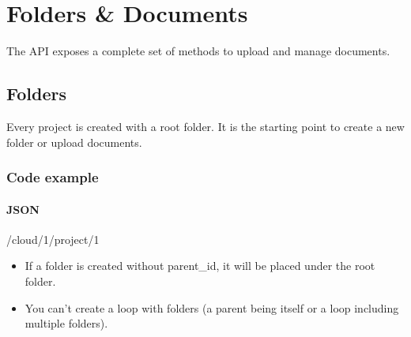\documentclass[a4paper,12pt,english]{sphinxmanual}
\begin{document}
\chapter{Folders \& Documents}
\label{\detokenize{folders_and_documents:folders-documents}}\label{\detokenize{folders_and_documents::doc}}
The API exposes a complete set of methods to upload and manage documents.


\section{Folders}
\label{\detokenize{folders_and_documents:folders}}
Every project is created with a root folder. It is the starting point to create a new folder or upload documents.


\subsection{Code example}
\label{\detokenize{folders_and_documents:code-example}}

\subsubsection{JSON}
\label{\detokenize{folders_and_documents:json}}
/cloud/1/project/1

%
\begin{sphinxVerbatim}[commandchars=\\\{\}]
     
     
     
     
     
     
     
\end{sphinxVerbatim}
\begin{itemize}
\item {} 
If a folder is created without parent\_id, it will be placed under the root folder.

\item {} 
You can’t create a loop with folders (a parent being itself or a loop including multiple folders).

\end{itemize}
\end{document}
